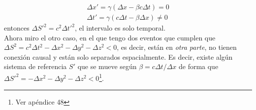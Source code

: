 \begin{equation*}
    \begin{matrix}
        \Delta x' = \gamma(\Delta x - \beta c \Delta t) = 0\\
        \Delta t' = \gamma(c\Delta t - \beta \Delta x) \neq 0
    \end{matrix}
\end{equation*}
entonces $\Delta S'^{2} = c^{2}\Delta t'^{2}$, el intervalo es solo temporal. \\
\indent Ahora miro el otro caso, en el que tengo dos eventos que cumplen que $\Delta S^{2} = c^{2}\Delta t^{2} - \Delta x^{2} - \Delta y^{2} - \Delta z^{2} < 0$, es decir, están en \textit{otra parte}, no tienen conexión causal y están solo separados espacialmente. Es decir, existe algún sistema de referencia $S'$ que se mueve según $\beta = c\Delta t/\Delta x$ de forma que $\Delta S'^{2} = -\Delta x^{2}-\Delta y^{2} - \Delta z^{2} < 0$\footnote{Ver apéndice 48}.




